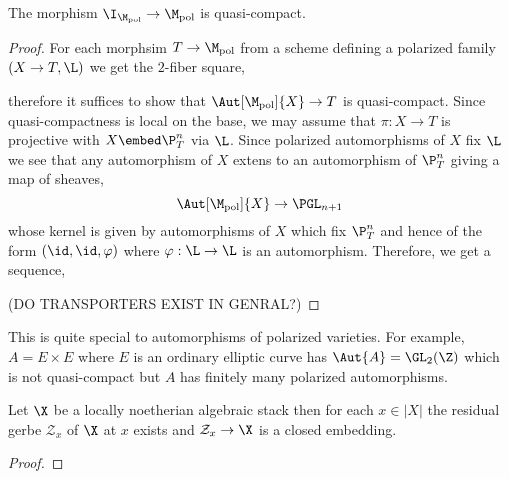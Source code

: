 \documentclass[12pt]{article}
\begin{document}
\begin{lemma}
The morphism $\I_{\M_{\pol}} \to \M_{\pol}$ is quasi-compact.
\end{lemma}

\begin{proof}
For each morphsim $T \to \M_{\pol}$ from a scheme defining a polarized family $(X \to T, \L)$ we get the $2$-fiber square,
\begin{center}
\end{center}
therefore it suffices to show that $\Aut[\M_\pol]{X} \to T$ is quasi-compact. Since quasi-compactness is local on the base, we may assume that $\pi : X \to T$ is projective with $X \embed \P^n_T$ via $\L$. Since polarized automorphisms of $X$ fix $\L$ we see that any automorphism of $X$ extens to an automorphism of $\P^n_T$ giving a map of sheaves,
\[ \Aut[\M_\pol]{X} \to \PGL_{n+1} \]
whose kernel is given by automorphisms of $X$ which fix $\P^n_T$ and hence of the form $(\id, \id, \varphi)$ where $\varphi : \L \to \L$ is an automorphism. Therefore, we get a sequence,
\begin{center}
\end{center}
(DO TRANSPORTERS EXIST IN GENRAL?)
\end{proof}

\begin{rmk}
This is quite special to automorphisms of polarized varieties. For example, $A = E \times E$ where $E$ is an ordinary elliptic curve has $\Aut{A} = \GL_2(\Z)$ which is not quasi-compact but $A$ has finitely many polarized automorphisms. 
\end{rmk}

\newcommand{\cZ}{\mathcal{Z}}

\begin{lemma}
Let $\X$ be a locally noetherian algebraic stack then for each $x \in |X|$ the residual gerbe $\cZ_x$ of $\X$ at $x$ exists and $\cZ_x \to \X$ is a closed embedding.
\end{lemma}

\begin{proof}

\end{proof}
\end{document}
